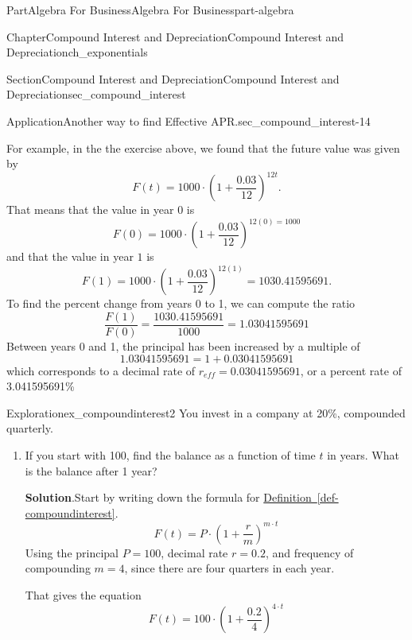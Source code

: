 \documentclass{tufte-book}
\newcommand{\blocktitlefont}{\relax}
\newcommand{\xreffont}{\relax}
\numberwithin{equation}{chapter}
\begin{document}
\begin{partptx}{Part}{Algebra For Business}{}{Algebra For Business}{}{}{part-algebra}
\begin{chapterptx}{Chapter}{Compound Interest and Depreciation}{}{Compound Interest and Depreciation}{}{}{ch_exponentials}
\begin{sectionptx}{Section}{Compound Interest and Depreciation}{}{Compound Interest and Depreciation}{}{}{sec_compound_interest}
\begin{insight}{Application}{Another way to find Effective APR.}{sec_compound_interest-14}
\par
For example, in the the exercise above, we found that the future value was given by%
\begin{equation*}
F(t) = 1000\cdot \left( 1 + \frac{0.03}{12}\right)^{12 t}\text{.}
\end{equation*}
That means that the value in year \(0\) is%
\begin{equation*}
F(0) = 1000\cdot \left( 1 + \frac{0.03}{12}\right)^{12 (0) = 1000}
\end{equation*}
and that the value in year \(1\) is%
\begin{equation*}
F(1) = 1000\cdot \left( 1 + \frac{0.03}{12}\right)^{12 (1)} = 1030.41595691\text{.}
\end{equation*}
To find the percent change from years 0 to 1, we can compute the ratio%
\begin{equation*}
\dfrac{F(1)}{F(0)} = \dfrac{1030.41595691}{1000} = 1.03041595691
\end{equation*}
Between years 0 and 1, the principal has been increased by a multiple of%
\begin{equation*}
1.03041595691 = 1 + 0.03041595691
\end{equation*}
which corresponds to a decimal rate of  \(r_{eff}=  0.03041595691\), or a percent rate of 3.041595691\%%
\end{insight}
\begin{exploration}{Exploration}{}{ex_compoundinterest2}%
You invest in a company at 20\%, compounded quarterly.%
\begin{enumerate}[font=\bfseries,label=(\alph*),ref=\alph*]%
\item{}If you start with \textdollar{}100, find the balance as a function of time \(t\) in years.  What is the balance after 1 year?%
\par\smallskip%
\noindent\textbf{\blocktitlefont Solution}.\hypertarget{ex_compoundinterest2-2-2}{}\quad{}Start by writing down the formula for  \hyperref[def-compoundinterest]{Definition~{\xreffont\ref{def-compoundinterest}}}.%
\begin{equation*}
F(t) = P \cdot \left(1 + \frac{r}{m}\right)^{m\cdot t}
\end{equation*}
Using the principal \(P=100\), decimal rate \(r=0.2\), and frequency of compounding \(m=4\), since there are four quarters in each year.%
\par
That gives the equation%
\begin{equation*}
F(t) = 100 \cdot \left(1 + \frac{0.2}{4}\right)^{4\cdot t}
\end{equation*}

\end{enumerate}
\end{exploration}
\end{sectionptx}
\end{chapterptx}
\end{partptx}
\end{document}
